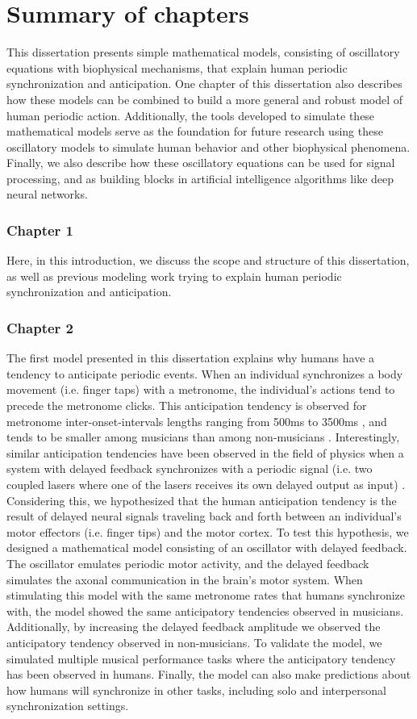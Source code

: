 \documentclass{report}
\begin{document}
\section{Summary of chapters}
This dissertation presents simple mathematical models, consisting of oscillatory equations with biophysical mechanisms, that explain human periodic synchronization and anticipation. One chapter of this dissertation also describes how these models can be combined to build a more general and robust model of human periodic action. Additionally, the tools developed to simulate these mathematical models serve as the foundation for future research using these oscillatory models to simulate human behavior and other biophysical phenomena. Finally, we also describe how these oscillatory equations can be used for signal processing, and as building blocks in artificial intelligence algorithms like deep neural networks.

\subsubsection{Chapter 1}
Here, in this introduction, we discuss the scope and structure of this dissertation, as well as previous modeling work trying to explain human periodic synchronization and anticipation.

\subsubsection{Chapter 2}
The first model presented in this dissertation explains why humans have a tendency to anticipate periodic events. When an individual synchronizes a body movement (i.e. finger taps) with a metronome, the individual’s actions tend to precede the metronome clicks. This anticipation tendency is observed for metronome inter-onset-intervals lengths ranging from 500ms to 3500ms \cite{repp2005sensorimotor}, and tends to be smaller among musicians than among non-musicians \cite{repp2007tapping}. Interestingly, similar anticipation tendencies have been observed in the field of physics when a system with delayed feedback synchronizes with a periodic signal (i.e. two coupled lasers where one of the lasers receives its own delayed output as input) \cite{stepp2010strong}. Considering this, we hypothesized that the human anticipation tendency is the result of delayed neural signals traveling back and forth between an individual’s motor effectors (i.e. finger tips) and the motor cortex. To test this hypothesis, we designed a mathematical model consisting of an oscillator with delayed feedback. The oscillator emulates periodic motor activity, and the delayed feedback simulates the axonal communication in the brain’s motor system. When stimulating this model with the same metronome rates that humans synchronize with, the model showed the same anticipatory tendencies observed in musicians. Additionally, by increasing the delayed feedback amplitude we observed the anticipatory tendency observed in non-musicians. To validate the model, we simulated multiple musical performance tasks where the anticipatory tendency has been observed in humans. Finally, the model can also make predictions about how humans will synchronize in other tasks, including solo and interpersonal synchronization settings.
\end{document}
